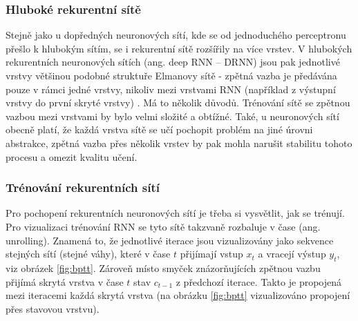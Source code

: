 

\subsubsection*{Hluboké rekurentní sítě}

Stejně jako u dopředných neuronových sítí, kde se od jednoduchého perceptronu
přešlo k hlubokým sítím, se i rekurentní sítě rozšířily na více vrstev. V
hlubokých rekurentních neuronových sítích (ang. deep RNN – DRNN) jsou pak
jednotlivé vrstvy většinou podobné struktuře Elmanovy sítě \cite{elman} -
zpětná vazba je předávána pouze v rámci jedné vrstvy, nikoliv mezi vrstvami RNN
(například z výstupní vrstvy do první skryté vrstvy) \cite{deeprnn}. Má to
několik důvodů. Trénování sítě se zpětnou vazbou mezi vrstvami by bylo velmi
složité a obtížné. Také, u neuronových sítí obecně platí, že každá vrstva sítě
se učí pochopit problém na jiné úrovni abstrakce, zpětná vazba přes několik
vrstev by pak mohla narušit stabilitu tohoto procesu a omezit kvalitu učení.

\subsubsection*{Trénování rekurentních sítí}

Pro pochopení rekurentních neuronových sítí je třeba si vysvětlit, jak se
trénují. Pro vizualizaci trénování RNN se tyto sítě takzvaně rozbaluje v čase
(ang. unrolling). Znamená to, že jednotlivé iterace jsou vizualizovány jako
sekvence stejných sítí (stejné váhy), které v čase $t$ přijímají vstup $x_t$ a
vracejí výstup $y_t$, viz obrázek \ref{fig:bptt}. Zároveň místo smyček
znázorňujících zpětnou vazbu přijímá skrytá vrstva v čase $t$ stav $c_{t-1}$ z
předchozí iterace. Takto je propojená mezi iteracemi každá skrytá vrstva (na
obrázku \ref{fig:bptt} vizualizováno propojení přes stavovou vrstvu).

